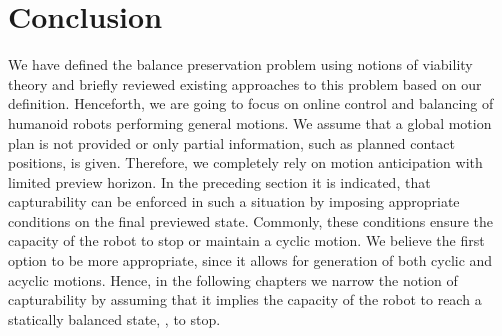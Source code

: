\section{Conclusion}\label{sec.conclusion}

We have defined the balance preservation problem using notions of viability
theory and briefly reviewed existing approaches to this problem based on our
definition. Henceforth, we are going to focus on online control and balancing
of humanoid robots performing general motions. We assume that a global motion
plan is not provided or only partial information, such as planned contact
positions, is given. Therefore, we completely rely on motion anticipation with
limited preview horizon. In the preceding section it is indicated, that
capturability can be enforced in such a situation by imposing appropriate
conditions on the final previewed state. Commonly, these conditions ensure the
capacity of the robot to stop or maintain a cyclic motion. We believe the first
option to be more appropriate, since it allows for generation of both cyclic
and acyclic motions. Hence, in the following chapters we narrow the notion of
capturability by assuming that it implies the capacity of the robot to reach a
statically balanced state, \IE, to stop.
